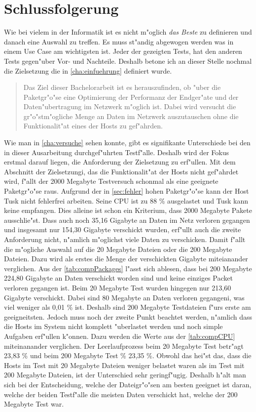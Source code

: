 \section{Schlussfolgerung}
\label{sec:schluss}

Wie bei vielem in der Informatik ist es nicht m"oglich \emph{das Beste} zu definieren %
und danach eine Auswahl zu treffen. Es muss st"andig abgewogen werden was in einem %
Use Case am wichtigsten ist. Jeder der gezeigten Tests, hat den anderen %
Tests gegen"uber Vor- und Nachteile. Deshalb betone ich an dieser Stelle nochmal die %
Zielsetzung die in \cref{cha:einfuehrung} definiert wurde. 

\begin{quotation}
Das Ziel dieser Bachelorarbeit ist es herauszufinden, ob "uber die Paketgr"o"se eine %
Optimierung der Performanz der Endger"ate und der Daten"ubertragung im Netzwerk m"oglich ist. %
Dabei wird versucht die gr"o"stm"ogliche Menge an Daten im Netzwerk auszutauschen ohne die %
Funktionalit"at eines der Hosts zu gef"ahrden. %
\end{quotation}

Wie man in \cref{cha:versuche} sehen konnte, gibt es signifikante Unterschiede bei den in dieser %
Ausarbeitung durchgef"uhrten Testf"alle. Deshalb wird der Fokus erstmal darauf liegen, die %
Anforderung der Zielsetzung zu erf"ullen. Mit dem Abschnitt der Zielsetzungi, das die %
Funktionalit"at der Hosts nicht gef"ahrdet wird, f"allt der 2000 Megabyte Testversuch %
schonmal als eine geeignete Paketgr"o"se raus. Aufgrund der in \cref{sec:fehler} %
hohen Paketgr"o"se kann der Host Tusk nicht fehlerfrei arbeiten. Seine CPU %
ist zu 88 \% ausgelastet und Tusk kann keine empfangen. Dies alleine ist schon %
ein Kriterium, dass 2000 Megabyte Pakete ausschlie"st. Dass auch noch 35,16 Gigabyte %
an Daten im Netz verloren gegangen und insgesamt nur 154,30 Gigabyte verschickt wurden, %
erf"ullt auch die zweite Anforderung nicht, n"amlich m"oglichst viele Daten zu verschicken. %
Damit f"allt die m"ogliche Auswahl auf die 20 Megabyte Dateien oder die 200 Megabyte %
Dateien. Dazu wird als erstes die Menge der verschickten Gigabyte miteianander verglichen. %
Aus der \cref{tab:compPackages} l"asst sich ablesen, dass bei 200 Megabyte 224,80 %
Gigabyte an Daten verschickt worden sind und keine einziges Packet verloren gegangen ist. %
Beim 20 Megabyte Test wurden hingegen nur 213,60 Gigabyte verschickt. Dabei sind 80 Megabyte %
an Daten verloren gegangeni, was viel weniger als 0,01 \% ist. Deshalb sind 200 Megabyte Testdateien %
f"urs erste am geeigneitsten. Jedoch muss noch der zweite Punkt beachtet werden, n"amlich %
dass die Hosts im System nicht komplett "uberlastet werden und noch simple Aufgaben %
erf"ullen k"onnen. Dazu werden die Werte aus der \cref{tab:compCPU} miteinanander verglichen. %
Der Leerlaufprozess beim 20 Megabyte Test betr"agt 23,83 \% und beim 200 Megabyte Test \% 23,35 \%. %
Obwohl das hei"st das, dass die Hosts im Test mit 20 Megabyte Dateien weniger belastet waren als im %
Test mit 200 Megabyte Dateien, ist der Unterschied sehr geringf"ugig. Deshalb h"alt man sich %
bei der Entscheidung, welche der Dateigr"o"sen am besten geeignet ist daran, welche der beiden %
Testf"alle die meisten Daten verschickt hat, welche der 200 Megabyte Test war. %

